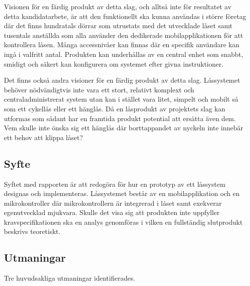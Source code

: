 \documentclass[11pt]{article}
\begin{document}
Visionen för en färdig produkt av detta slag, och alltså inte för resultatet av detta kandidatarbete, är att den funktionellt ska kunna användas i större företag där det finns hundratals dörrar som utrustats med det utvecklade låset samt tusentals anställda som alla använder den dedikerade mobilapplikationen för att kontrollera låsen. Många accessnivåer kan finnas där en specifik användare kan ingå i valfritt antal. Produkten kan underhållas av en central enhet som snabbt, smidigt och säkert kan konfigurera om systemet efter givna instruktioner.

Det finns också andra visioner för en färdig produkt av detta slag. Låssystemet behöver nödvändigtvis inte vara ett stort, relativt komplext och centraladministrerat system utan kan i stället vara litet, simpelt och mobilt så som ett cykellås eller ett hänglås. Då en låsprodukt av projektets slag kan utformas som sådant har en framtida produkt potential att ersätta även dem. Vem skulle inte önska sig ett hänglås där borttappandet av nyckeln inte innebär ett behov att klippa låset?


\subsection{Syfte}
Syftet med rapporten är att redogöra för hur en prototyp av ett låssystem designas och implementeras. Låssystemet består av en mobilapplikation och en mikrokontroller där mikrokontrollern är integrerad i låset samt exekverar egenutvecklad mjukvara. Skulle det visa sig att produkten inte uppfyller kravspecifikationen ska en analys genomföras i vilken en fullständig slutprodukt beskrivs teoretiskt.


\subsection{Utmaningar}
Tre huvudsakliga utmaningar identifierades.
\end{document}
